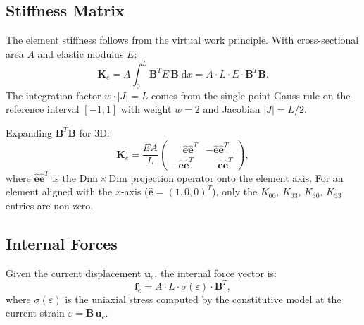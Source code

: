 \subsection{Stiffness Matrix}
\label{sec:truss-stiffness}

The element stiffness follows from the virtual work principle.  With
cross-sectional area $A$ and elastic modulus $E$:
\begin{equation}
    \mathbf{K}_e = A \int_0^L \mathbf{B}^T E\, \mathbf{B}\;\mathrm{d}x
    = A \cdot L \cdot E \cdot \mathbf{B}^T \mathbf{B}.
    \label{eq:truss-K}
\end{equation}
The integration factor $w \cdot |J| = L$ comes from the single-point
Gauss rule on the reference interval $[-1,1]$ with weight $w=2$ and
Jacobian $|J| = L/2$.

Expanding $\mathbf{B}^T \mathbf{B}$ for 3D:
\begin{equation}
    \mathbf{K}_e = \frac{EA}{L}
    \begin{pmatrix}
        \phantom{-}\hat{\mathbf{e}}\hat{\mathbf{e}}^T
            & -\hat{\mathbf{e}}\hat{\mathbf{e}}^T \\[4pt]
        -\hat{\mathbf{e}}\hat{\mathbf{e}}^T
            & \phantom{-}\hat{\mathbf{e}}\hat{\mathbf{e}}^T
    \end{pmatrix},
    \label{eq:truss-K-expanded}
\end{equation}
where $\hat{\mathbf{e}}\hat{\mathbf{e}}^T$ is the $\mathrm{Dim}\times\mathrm{Dim}$
projection operator onto the element axis.  For an element aligned with the
$x$-axis ($\hat{\mathbf{e}} = (1,0,0)^T$), only the $K_{00}$, $K_{03}$,
$K_{30}$, $K_{33}$ entries are non-zero.


\subsection{Internal Forces}
\label{sec:truss-internal-forces}

Given the current displacement $\mathbf{u}_e$, the internal force vector is:
\begin{equation}
    \mathbf{f}_e = A \cdot L \cdot \sigma(\varepsilon) \cdot \mathbf{B}^T,
    \label{eq:truss-f}
\end{equation}
where $\sigma(\varepsilon)$ is the uniaxial stress computed by the
constitutive model at the current strain $\varepsilon = \mathbf{B}\,\mathbf{u}_e$.


